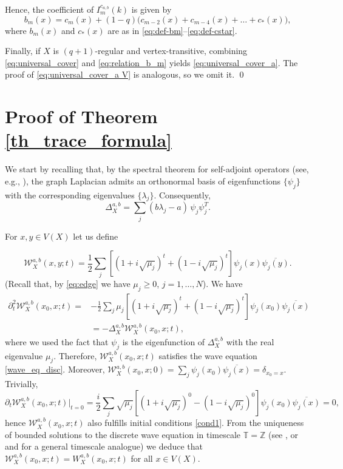 \documentclass[reqno,10pt]{amsart}
\theoremstyle{definition}
\numberwithin{equation}{section}
\begin{document}
Hence, the coefficient of $I_m^{c_{a,b}}(k)$ is given by
\[
    b_m(x) = c_m(x) + (1-q)\big( c_{m-2}(x) + c_{m-4}(x) + \dots + c_*(x) \big),
\]
where $b_m(x)$ and $c_*(x)$ are as in \eqref{eq:def-bm}–\eqref{eq:def-cstar}.

Finally, if $X$ is $(q+1)$-regular and vertex-transitive, combining \eqref{eq:universal_cover} and \eqref{eq:relation_b_m} yields \eqref{eq:universal_cover_a}. The proof of \eqref{eq:universal_cover_a V} is analogous, so we omit it.
\qed

\section{Proof of Theorem \ref{th_trace_formula}}



We start by recalling that, by the spectral theorem for self-adjoint operators (see, e.g.,
\cite[Chapter~1]{Ch97}), the graph Laplacian admits an orthonormal basis
of eigenfunctions $\{\psi_j\}$ with the corresponding eigenvalues
$\{\lambda_j\}$. Consequently, 
\[
\Delta_X^{a,b}
=
\sum_j (b\lambda_j-a)\,\psi_j\psi_j^T.
\]

For $x,y\in V(X)$ let us define

\begin{equation}\label{eq. wave spectral}
\mathcal W_X^{a,b}(x,y;t)
=
\frac12
\sum_j
\left[
\left(1+i\sqrt{\mu_j}\right)^t
+
\left(1-i\sqrt{\mu_j}\right)^t
\right]
\psi_j(x)\overline{\psi_j(y)}.
\end{equation}
(Recall that, by \eqref{eq:edge} we have $\mu_j\geq 0$, $j=1,\ldots,N$).
We have
\begin{equation*}
\begin{split}
    \partial_t^2 \mathcal W_X^{a,b}(x_0,x;t) =& - \frac12\sum_j\mu_j\left[
\left(1+i\sqrt{\mu_j}\right)^t
+
\left(1-i\sqrt{\mu_j}\right)^t
\right] \psi_j(x_0)\overline{\psi_j(x)}\\
&= -\Delta_X^{a,b}\mathcal W_X^{a,b}(x_0,x;t),
\end{split}
\end{equation*}
where we used the fact that $\psi_j$ is the  eigenfunction of $\Delta_X^{a,b}$ with the real eigenvalue $\mu_j$. Therefore, $\mathcal W_X^{a,b}(x_0,x;t)$ satisfies the wave equation \eqref{wave_eq_disc}. Moreover, $\mathcal W_X^{a,b}(x_0,x;0)= \sum\limits_j
\psi_j(x_0)\overline{\psi_j(x)}=\delta_{x_0=x}$. Trivially,
\begin{equation*}
\partial_t\mathcal W_X^{a,b}(x_0,x;t)\big|_{t=0} = \frac{i}2
\sum_j
\sqrt{\mu_j}\left[
\left(1+i\sqrt{\mu_j}\right)^0
-
\left(1-i\sqrt{\mu_j}\right)^0
\right]
\psi_j(x_0)\overline{\psi_j(x)}=0,
\end{equation*}
hence $\mathcal W_X^{a,b}(x_0,x;t)$ also fulfills initial conditions \eqref{cond1}. From the uniqueness of bounded solutions to the discrete wave equation in timescale $\mathbb T =\mathbb Z$ (see \cite[Theorem 3.1.]{Slav17}, or \cite{ABEPT03} and \cite{CS26} for a general timescale analogue) we deduce that $\mathcal W_X^{a,b}(x_0,x;t) = W_X^{a,b}(x_0,x;t)$ for all $x\in V(X)$.
\end{document}
